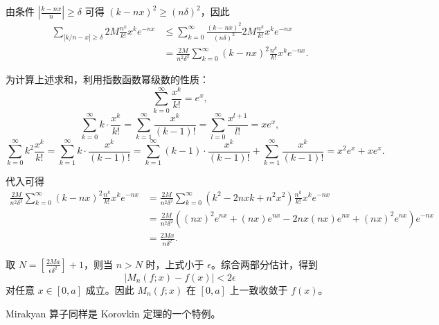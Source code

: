 由条件 $|\frac{k-nx}{n}| \geq \delta$ 可得 $(k-nx)^2 \geq (n\delta)^2$，因此
\begin{align*}
\sum_{|k/n - x| \geq \delta} 2M \frac{n^k}{k!} x^k e^{-nx}
&\leq \sum_{k=0}^{\infty} \frac{(k-nx)^2}{(n\delta)^2} 2M \frac{n^k}{k!} x^k e^{-nx} \\
&= \frac{2M}{n^2\delta^2} \sum_{k=0}^{\infty} (k-nx)^2 \frac{n^k}{k!} x^k e^{-nx}.
\end{align*}

为计算上述求和，利用指数函数幂级数的性质：
\[
\sum_{k=0}^{\infty} \frac{x^k}{k!} = e^x,
\]
\[
\sum_{k=0}^{\infty} k \cdot \frac{x^k}{k!}
= \sum_{k=1}^{\infty} \frac{x^k}{(k-1)!}
= \sum_{l=0}^{\infty} \frac{x^{l+1}}{l!}
= x e^{x},
\]
\[
\sum_{k=0}^{\infty} k^2 \frac{x^k}{k!}
= \sum_{k=1}^{\infty} k \cdot \frac{x^k}{(k-1)!}
= \sum_{k=1}^{\infty} (k-1) \cdot \frac{x^k}{(k-1)!} + \sum_{k=1}^{\infty} \frac{x^k}{(k-1)!}
= x^2 e^x + x e^x.
\]

代入可得
\begin{align*}
\frac{2M}{n^2\delta^2} \sum_{k=0}^{\infty} (k-nx)^2 \frac{n^k}{k!} x^k e^{-nx}
&= \frac{2M}{n^2\delta^2} \sum_{k=0}^{\infty} (k^2 - 2nxk + n^2x^2) \frac{n^k}{k!} x^k e^{-nx} \\
&= \frac{2M}{n^2\delta^2} \left( (nx)^2 e^{nx} + (nx) e^{nx} - 2nx(nx) e^{nx} + (nx)^2 e^{nx} \right) e^{-nx} \\
&= \frac{2Mx}{n\delta^2}.
\end{align*}

取 $N = \left[\frac{2Ma}{\epsilon \delta^2}\right]+1$，则当 $n > N$ 时，上式小于 $\epsilon$。综合两部分估计，得到
\[
|M_n(f;x)-f(x)| < 2\epsilon
\]
对任意 $x \in [0,a]$ 成立。因此 $M_n(f;x)$ 在 $[0,a]$ 上一致收敛于 $f(x)$。

Mirakyan 算子同样是 Korovkin 定理的一个特例。